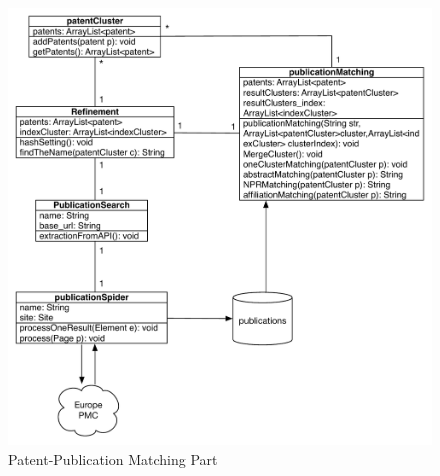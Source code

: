 \begin{figure}
\centering
\includegraphics[width=\headwidth]{publicationMatching.pdf}
\caption{Patent-Publication Matching Part}
\end{figure}


\newpage

